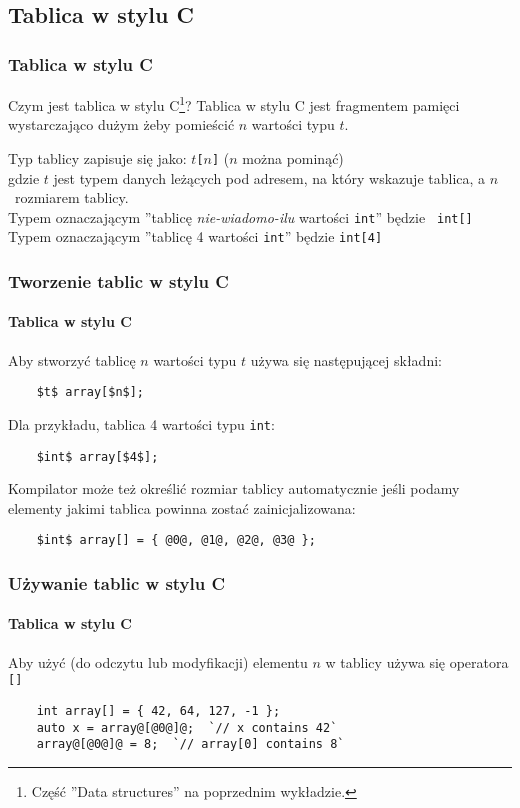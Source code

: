 \documentclass[aspectratio=169]{beamer}
\begin{document}
\subsection{Tablica w stylu C}

\begin{frame}
    \frametitle{Tablica w stylu C}

    Czym jest tablica w stylu C\footnote{Część ''Data structures'' na poprzednim
    wykładzie.}? Tablica w stylu C jest fragmentem pamięci wystarczająco
    dużym żeby pomieścić $n$ wartości typu $t$.
    \label{what_is_a_c_style_array}

    \vspace{1em}

    Typ tablicy zapisuje się jako: {\tt $t$[$n$]} ($n$ można pominąć)\\
    gdzie $t$ jest typem danych leżących pod adresem, na który wskazuje tablica,
    a $n$~rozmiarem tablicy.\\
    Typem oznaczającym ''tablicę \emph{nie-wiadomo-ilu} wartości {\tt int}'' będzie {\tt
    int[]}\\
    Typem oznaczającym ''tablicę 4 wartości {\tt int}'' będzie {\tt int[4]}
\end{frame}

\begin{frame}[fragile]
    \frametitle{Tworzenie tablic w stylu C}
    \framesubtitle{Tablica w stylu C}

    Aby stworzyć tablicę $n$ wartości typu $t$ używa się następującej składni:

    \begin{lstlisting}
    $t$ array[$n$];
    \end{lstlisting}

    Dla przykładu, tablica 4 wartości typu {\tt int}:

    \begin{lstlisting}
    $int$ array[$4$];
    \end{lstlisting}

    Kompilator może też określić rozmiar tablicy automatycznie jeśli podamy
    elementy jakimi tablica powinna zostać zainicjalizowana:

    \begin{lstlisting}
    $int$ array[] = { @0@, @1@, @2@, @3@ };
    \end{lstlisting}
\end{frame}

\begin{frame}[fragile]
    \frametitle{Używanie tablic w stylu C}
    \framesubtitle{Tablica w stylu C}

    Aby użyć (do odczytu lub modyfikacji) elementu $n$ w tablicy używa się
    operatora {\tt []}

    \begin{lstlisting}
    int array[] = { 42, 64, 127, -1 };
    auto x = array@[@0@]@;  `// x contains 42`
    array@[@0@]@ = 8;  `// array[0] contains 8`
    \end{lstlisting}
\end{frame}
\end{document}
